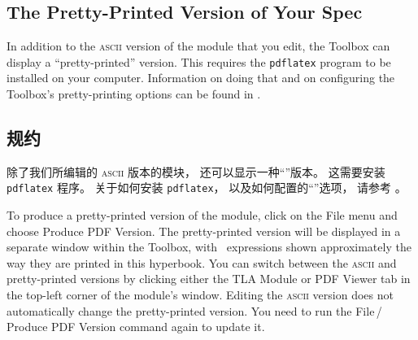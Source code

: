 \begin{en}
  \vspace{-\baselineskip}%
\subsection{The Pretty-Printed Version of Your Spec}

In addition to the \textsc{ascii} version of the module that you edit,
the Toolbox can display a ``pretty-printed'' version.  This requires
the 
\texttt{pdflatex} program to be installed on your computer.
Information on doing that and on configuring the Toolbox's
pretty-printing options can be found in 
.
\end{en}

\begin{ch}
  \vspace{-\baselineskip}%
  \subsection{\tlaprettyprinted{}规约}

  除了我们所编辑的 \textsc{ascii} 版本的模块，
  \tlatoolbox{}还可以显示一种``\tlaprettyprinted{}''版本。
  这需要安装
  \texttt{pdflatex} 程序。
  关于如何安装 \texttt{pdflatex}，
  以及如何配置\tlatoolbox{}的``\tlaprettyprinting{}''选项，
  请参考%
  。
\end{ch}

\begin{en}
To produce a pretty-printed version of the module, click on the
\textsf{File} menu and choose \textsf{Produce PDF Version}.  The 
pretty-printed version will be displayed in a separate window within
the Toolbox, with \tlaplus\ expressions shown approximately the way
they are printed in this hyperbook.  You can switch
between the \textsc{ascii} and
pretty-printed versions by clicking either the \textsf{TLA Module} or
\textsf{PDF Viewer} tab in the top-left corner of the module's window.
Editing the \textsc{ascii} version does not automatically change the
pretty-printed version.  You need to run the
\textsf{File}\,/\,\textsf{Produce PDF Version} command again to update it.
\end{en}

